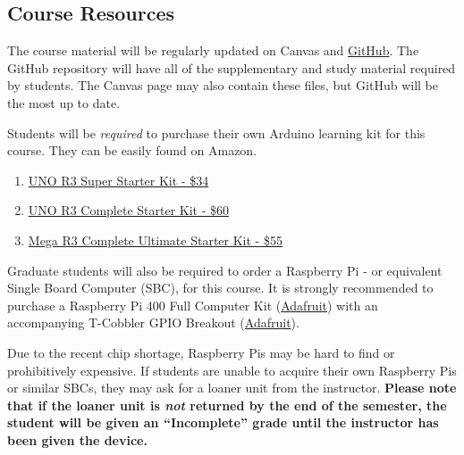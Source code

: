     \subsection*{Course Resources}
    The course material will be regularly updated on Canvas and \href{https://github.com/Legohead259/OCE4531-Material} {GitHub}. The GitHub repository will have all of the supplementary and study material required by students. The Canvas page may also contain these files, but GitHub will be the most up to date.
    
    Students will be \emph{required} to purchase their own Arduino learning kit for this course. They can be easily found on Amazon.
    \begin{enumerate}
        \item \href{https://www.amazon.com/ELEGOO-Project-Tutorial-Controller-Projects/dp/B01D8KOZF4}
        {UNO R3 Super Starter Kit - \$34}
        \item \href{https://www.amazon.com/EL-KIT-001-Project-Complete-Starter-Tutorial/dp/B01CZTLHGE} 
        {UNO R3 Complete Starter Kit - \$60}
        \item \href{https://www.amazon.com/EL-KIT-008-Project-Complete-Ultimate-TUTORIAL/dp/B01EWNUUUA}
        {Mega R3 Complete Ultimate Starter Kit - \$55}
    \end{enumerate}

    Graduate students will also be required to order a Raspberry Pi - or equivalent Single Board Computer (SBC), for this course. 
    It is strongly recommended to purchase a Raspberry Pi 400 Full Computer Kit (\href{https://www.adafruit.com/product/4796}{Adafruit}) with an accompanying T-Cobbler GPIO Breakout (\href{https://www.adafruit.com/product/2028}{Adafruit}).
    
    Due to the recent chip shortage, Raspberry Pis may be hard to find or prohibitively expensive. If students are unable to acquire their own Raspberry Pis or similar SBCs, they may ask for a loaner unit from the instructor. \textbf{Please note that if the loaner unit is \emph{not} returned by the end of the semester, the student will be given an ``Incomplete'' grade until the instructor has been given the device.}

